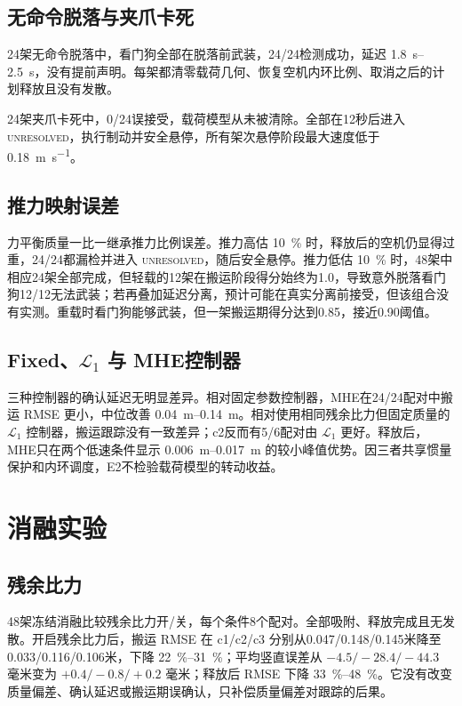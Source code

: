 \documentclass[11pt,UTF8,fontset=none]{ctexrep}
\begin{document}
\subsection{无命令脱落与夹爪卡死}

24架无命令脱落中，看门狗全部在脱落前武装，24/24检测成功，延迟 \SIrange{1.8}{2.5}{\second}，没有提前声明。每架都清零载荷几何、恢复空机内环比例、取消之后的计划释放且没有发散。

24架夹爪卡死中，0/24误接受，载荷模型从未被清除。全部在12秒后进入 \textsc{unresolved}，执行制动并安全悬停，所有架次悬停阶段最大速度低于 \SI{0.18}{\meter\per\second}。

\subsection{推力映射误差}

力平衡质量一比一继承推力比例误差。推力高估 \SI{10}{\percent} 时，释放后的空机仍显得过重，24/24都漏检并进入 \textsc{unresolved}，随后安全悬停。推力低估 \SI{10}{\percent} 时，48架中相应24架全部完成，但轻载的12架在搬运阶段得分始终为1.0，导致意外脱落看门狗12/12无法武装；若再叠加延迟分离，预计可能在真实分离前接受，但该组合没有实测。重载时看门狗能够武装，但一架搬运期得分达到0.85，接近0.90阈值。

\subsection{Fixed、\texorpdfstring{$\mathcal L_1$}{L1} 与 MHE控制器}

三种控制器的确认延迟无明显差异。相对固定参数控制器，MHE在24/24配对中搬运 RMSE 更小，中位改善 \SIrange{0.04}{0.14}{\meter}。相对使用相同残余比力但固定质量的 $\mathcal L_1$ 控制器，搬运跟踪没有一致差异；c2反而有5/6配对由 $\mathcal L_1$ 更好。释放后，MHE只在两个低速条件显示 \SIrange{0.006}{0.017}{\meter} 的较小峰值优势。因三者共享惯量保护和内环调度，E2不检验载荷模型的转动收益。

\section{消融实验}

\subsection{残余比力}

48架冻结消融比较残余比力开/关，每个条件8个配对。全部吸附、释放完成且无发散。开启残余比力后，搬运 RMSE 在 c1/c2/c3 分别从0.047/0.148/0.145米降至0.033/0.116/0.106米，下降 \SIrange{22}{31}{\percent}；平均竖直误差从 $-4.5/-28.4/-44.3$ 毫米变为 $+0.4/-0.8/+0.2$ 毫米；释放后 RMSE 下降 \SIrange{33}{48}{\percent}。它没有改变质量偏差、确认延迟或搬运期误确认，只补偿质量偏差对跟踪的后果。
\end{document}
